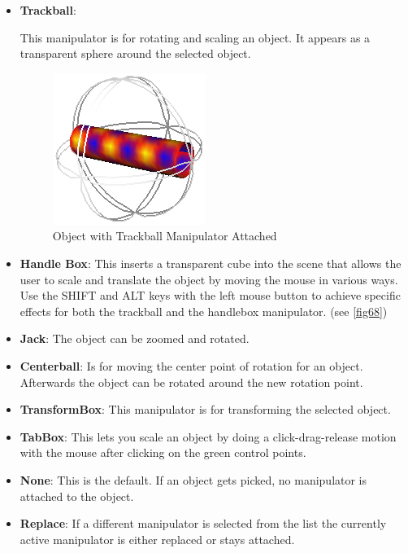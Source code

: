 \begin{itemize}
\item {\bf Trackball}:

This manipulator is for rotating and scaling an object. It appears as a
transparent sphere around the selected object.

 \latexonly
 \begin{figure}[htp]
  \begin{center}
   \includegraphics[scale=0.7]{renderer/pict/image20}
   \caption{Object with Trackball Manipulator Attached}
	\label{fig67}
  \end{center}
 \end{figure}
 \endlatexonly
\item {\bf Handle Box}: This inserts a transparent cube into the scene that allows the user to
scale and translate the object by moving the mouse in various ways.
Use the SHIFT and ALT keys with the left mouse button to achieve specific
effects for both the trackball and the handlebox manipulator. (see \ref{fig68})

\item {\bf Jack}: The object can be zoomed and rotated.

\item {\bf Centerball}: Is for moving the center point of rotation for an object. Afterwards
the object can be rotated around the new rotation point.

\item {\bf TransformBox}: This manipulator is for transforming the selected object. 

\item {\bf TabBox}: This lets you scale an object by doing a click-drag-release motion with
the mouse after clicking on the green control points.

\item {\bf None}: This is the default. If an object gets picked, no manipulator is attached to the object.

\item {\bf Replace}: If a different manipulator is selected from the list the currently active
manipulator is either replaced or stays attached. 


\end{itemize}
